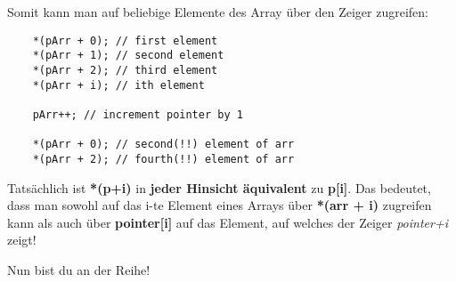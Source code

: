 Somit kann man auf beliebige Elemente des Array über den Zeiger zugreifen:
\begin{lstlisting}
	*(pArr + 0); // first element
	*(pArr + 1); // second element
	*(pArr + 2); // third element
	*(pArr + i); // ith element
	
	pArr++; // increment pointer by 1
	
	*(pArr + 0); // second(!!) element of arr
	*(pArr + 2); // fourth(!!) element of arr
\end{lstlisting}

Tatsächlich ist \textbf{*(p+i)} in \textbf{jeder Hinsicht äquivalent} zu \textbf{p[i]}.
Das bedeutet, dass man sowohl auf das i-te Element eines Arrays über \textbf{*(arr + i)} zugreifen kann als auch über \textbf{pointer[i]} auf das Element, auf welches der Zeiger \emph{pointer+i} zeigt!

Nun bist du an der Reihe!

